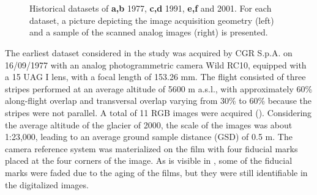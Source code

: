 \begin{figure}
{    } \\
     \\
    \caption{Historical datasets of \textbf{a,b} 1977, \textbf{c,d} 1991, \textbf{e,f} and 2001. For each dataset, a picture depicting the image acquisition geometry (left) and a sample of the scanned analog images (right) is presented.}
    \label{fig:2:datasets_historical}
\end{figure}

The earliest dataset considered in the study was acquired by CGR S.p.A. on 16/09/1977
with an analog photogrammetric camera Wild RC10, equipped with a 15 UAG I lens, with
a focal length of 153.26 mm. The flight consisted of three stripes performed at an average
altitude of 5600 m a.s.l., with approximately 60\% along-flight overlap and transversal
overlap varying from 30\% to 60\% because the stripes were not parallel. A total of 11 RGB
images were acquired (). 
Considering the average altitude of the glacier of \SI{2000}{\masl}, the scale of the images
was about 1:23,000, leading to an average ground
sample distance (GSD) of 0.5 m. The camera reference system was materialized on the film
with four fiducial marks placed at the four corners of the image. As is visible in ,
some of the fiducial marks were faded due to the aging of the films, but they were still
identifiable in the digitalized images.

